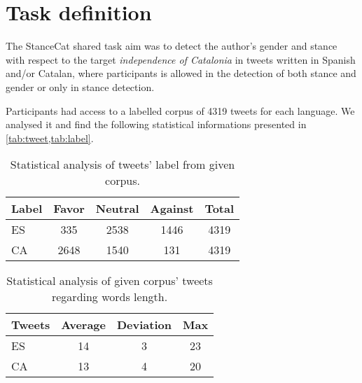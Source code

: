 \section{Task definition} \label{sec:task}

The StanceCat shared task aim was to detect the author's gender and stance with respect to the target \emph{independence of Catalonia} in tweets written in Spanish and/or Catalan, where participants is allowed in the detection of both stance and gender or only in stance detection.

Participants had access to a labelled corpus of 4319 tweets for each language. We analysed it and find the following statistical informations presented in \cref{tab:tweet,tab:label}.

\begin{table}[h]
\footnotesize
\centering
\begin{tabular}{lcccc}
\hline
Label		& Favor		& Neutral		& Against	& Total		\\
\hline
ES			& 335		& 2538			& 1446		& 4319		\\
CA			& 2648		& 1540			& 131		& 4319		\\
\hline
\end{tabular}
\caption{Statistical analysis of tweets' label from given corpus.}
\label{tab:label}
\end{table}

\begin{table}[h]
\footnotesize
\centering
\begin{tabular}{lccc}
\hline
Tweets		& Average		& Deviation		& Max		\\
\hline
ES			& 14			& 3				& 23		\\ 
CA			& 13			& 4				& 20		\\ 
\hline
\end{tabular}
\caption{Statistical analysis of given corpus' tweets regarding words length.}
\label{tab:tweet}
\end{table}



